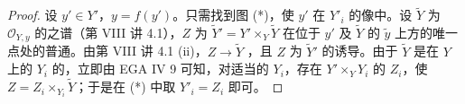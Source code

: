 \begin{proof}
设 $y'\in Y'$，$y=f(y')$。只需找到图 (*)，使 $y'$ 在 $Y'_i$ 的像中。设 $\widetilde Y$ 为 $\mathscr O_{Y,y}$ 的之谱（第 VIII 讲 4.1），$Z$ 为 $\widetilde Y'=Y'\times_Y\widetilde Y$ 在位于 $y'$ 及 $\widetilde Y$ 的 $\widetilde y$ 上方的唯一点处的普通。由第 VIII 讲 4.1 (ii)，$Z\to\widetilde Y$ ，且 $Z$ 为 $\widetilde Y'$ 的诱导。由于 $\widetilde Y$ 是在 $Y$ 上的 $Y_i$ 的，立即由 EGA IV 9 可知，对适当的 $Y_i$，存在 $Y'\times_Y Y_i$ 的 $Z_i$，使 $Z=Z_i\times_{Y_i}\widetilde Y$；于是在 (*) 中取 $Y'_i=Z_i$ 即可。
\end{proof}

